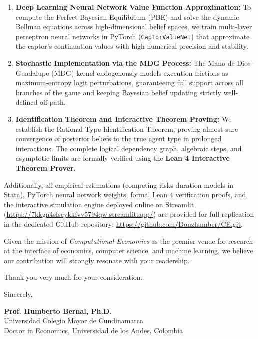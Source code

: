 \documentclass[12pt]{article}
\begin{document}
\begin{enumerate}
    \item \textbf{Deep Learning Neural Network Value Function Approximation:} To compute the Perfect Bayesian Equilibrium (PBE) and solve the dynamic Bellman equations across high-dimensional belief spaces, we train multi-layer perceptron neural networks in PyTorch (\texttt{CaptorValueNet}) that approximate the captor's continuation values with high numerical precision and stability.
    
    \item \textbf{Stochastic Implementation via the MDG Process:} The Mano de Dios--Guadalupe (MDG) kernel endogenously models execution frictions as maximum-entropy logit perturbations, guaranteeing full support across all branches of the game and keeping Bayesian belief updating strictly well-defined off-path.
    
    \item \textbf{Identification Theorem and Interactive Theorem Proving:} We establish the Rational Type Identification Theorem, proving almost sure convergence of posterior beliefs to the true agent type in prolonged interactions. The complete logical dependency graph, algebraic steps, and asymptotic limits are formally verified using the \textbf{Lean 4 Interactive Theorem Prover}.
\end{enumerate}

Additionally, all empirical estimations (competing risks duration models in Stata), PyTorch neural network weights, formal Lean 4 verification proofs, and the interactive simulation engine deployed online on Streamlit (\url{https://7kkgn4sfscykkfvv5794qw.streamlit.app/}) are provided for full replication in the dedicated GitHub repository: \url{https://github.com/Donzhumber/CE.git}.

Given the mission of \textit{Computational Economics} as the premier venue for research at the interface of economics, computer science, and machine learning, we believe our contribution will strongly resonate with your readership.

Thank you very much for your consideration.

\vspace{2.5em}

\begin{flushleft}
Sincerely,

\vspace{2.5em}

\textbf{Prof. Humberto Bernal, Ph.D.} \\
Universidad Colegio Mayor de Cundinamarca \\
Doctor in Economics, Universidad de los Andes, Colombia
\end{flushleft}
\end{document}
